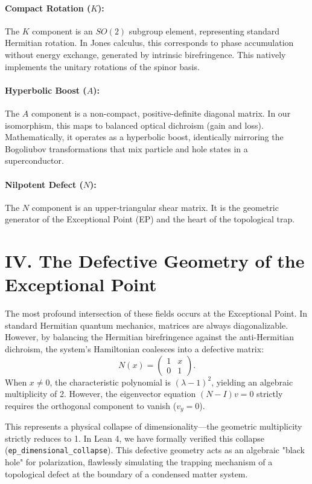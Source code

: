 \documentclass[aps,prx,twocolumn,superscriptaddress,amsmath,amssymb]{revtex4-2}
\begin{document}
\paragraph{Compact Rotation ($K$):} The $K$ component is an $SO(2)$ subgroup element, representing standard Hermitian rotation. In Jones calculus, this corresponds to phase accumulation without energy exchange, generated by intrinsic birefringence. This natively implements the unitary rotations of the spinor basis.

\paragraph{Hyperbolic Boost ($A$):} The $A$ component is a non-compact, positive-definite diagonal matrix. In our isomorphism, this maps to balanced optical dichroism (gain and loss). Mathematically, it operates as a hyperbolic boost, identically mirroring the Bogoliubov transformations that mix particle and hole states in a superconductor.

\paragraph{Nilpotent Defect ($N$):} The $N$ component is an upper-triangular shear matrix. It is the geometric generator of the Exceptional Point (EP) and the heart of the topological trap.

\section{IV. The Defective Geometry of the Exceptional Point}
The most profound intersection of these fields occurs at the Exceptional Point. In standard Hermitian quantum mechanics, matrices are always diagonalizable. However, by balancing the Hermitian birefringence against the anti-Hermitian dichroism, the system's Hamiltonian coalesces into a defective matrix:
\begin{equation}
N(x) = \begin{pmatrix} 1 & x \\ 0 & 1 \end{pmatrix}.
\end{equation}
When $x \neq 0$, the characteristic polynomial is $(\lambda-1)^2$, yielding an algebraic multiplicity of 2. However, the eigenvector equation $(N-I)v = 0$ strictly requires the orthogonal component to vanish ($v_y = 0$). 

This represents a physical collapse of dimensionality—the geometric multiplicity strictly reduces to 1. In Lean 4, we have formally verified this collapse (\texttt{ep\_dimensional\_collapse}). This defective geometry acts as an algebraic "black hole" for polarization, flawlessly simulating the trapping mechanism of a topological defect at the boundary of a condensed matter system.
\end{document}
